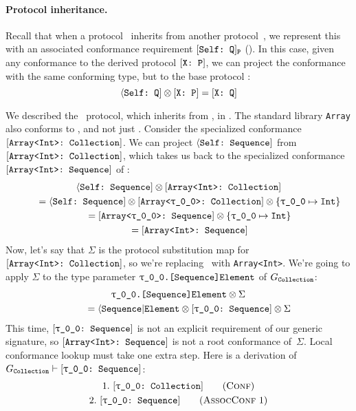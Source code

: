 \documentclass[../generics]{subfiles}
\begin{document}
\paragraph{Protocol inheritance.}
Recall that when a protocol \tP\ inherits from another protocol~\tQ, we represent this with an associated conformance requirement $[\texttt{Self:~Q}]_{\texttt{P}}$ (). In this case, given any conformance to the derived protocol $[\texttt{X:~P}]$, we can project the conformance with the same conforming type, but to the base protocol \tQ:
\[
\langle\texttt{Self:~Q}] \otimes [\texttt{X:~P}] = [\texttt{X:~Q}]
\]

\begin{example}\label{protocol inherit assoc conf}
We described the \tCollection\ protocol, which inherits from \tSequence, in . The standard library \texttt{Array} also conforms to \tCollection, and not just \tSequence. Consider the specialized conformance $[\texttt{Array<Int>:~Collection}]$. We can project $\langle\texttt{Self:~Sequence}]$ from $[\texttt{Array<Int>:~Collection}]$, which takes us back to the specialized conformance $[\texttt{Array<Int>:~Sequence}]$ of :
\begin{gather*}
\AssocConf{Self}{Sequence} \otimes \ArrayIntCollection \\
\qquad {} = \AssocConf{Self}{Sequence} \otimes \ArrayCollection \otimes \SubMapInt\\
\qquad {} = \ArraySequence \otimes \SubMapInt\\
\qquad {} = \ArrayIntSequence
\end{gather*}
Now, let's say that $\Sigma$ is the protocol substitution map for $[\texttt{Array<Int>:~Collection}]$, so we're replacing \rT\ with \texttt{Array<Int>}. We're going to apply $\Sigma$ to the type parameter $\texttt{\rT.[Sequence]Element}$ of $G_{\texttt{Collection}}$:
\begin{gather*}
\texttt{\rT.[Sequence]Element} \otimes \Sigma \\
\qquad {} = \AElement \otimes \ConfReq{\rT}{Sequence} \otimes \Sigma
\end{gather*}
This time, $\ConfReq{\rT}{Sequence}$ is not an explicit requirement of our generic signature, so $[\texttt{Array<Int>:~Sequence}]$ is not a root conformance of~$\Sigma$. Local conformance lookup must take one extra step. Here is a derivation of $G_\tCollection\vdash\ConfReq{\rT}{Sequence}$:
\begin{gather*}
\ConfStep{\rT}{Collection}{1}\\
\AssocConfStep{1}{\rT}{Sequence}{2}

\end{gather*}
\end{example}
\end{document}
